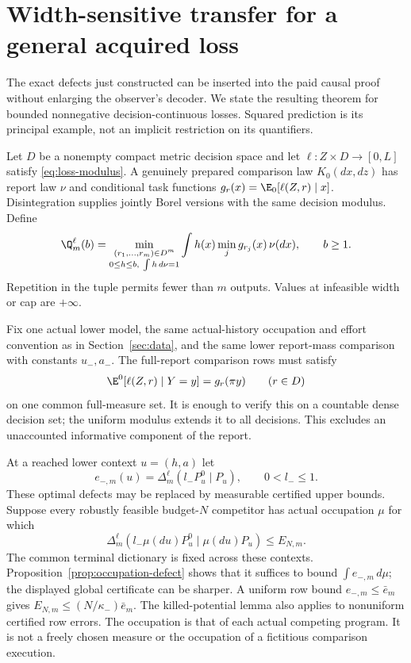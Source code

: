 \section{Width-sensitive transfer for a general acquired loss}\label{sec:loss-transfer}
The exact defects just constructed can be inserted into the paid causal proof without enlarging the observer's decoder. We state the resulting theorem for bounded nonnegative decision-continuous losses. Squared prediction is its principal example, not an implicit restriction on its quantifiers.

Let $D$ be a nonempty compact metric decision space and let $\ell:Z\times D\to[0,L]$ satisfy \eqref{eq:loss-modulus}. A genuinely prepared comparison law $K_0(dx,dz)$ has report law $\nu$ and conditional task functions $g_r(x)=\E_0[\ell(Z,r)\mid x]$. Disintegration supplies jointly Borel versions with the same decision modulus. Define
\begin{equation}\label{eq:general-profile}
 \Q_m^\ell(b)=\min_{\substack{(r_1,\ldots,r_m)\in D^m\\0\le h\le b,\ \int h\,d\nu=1}}
       \int h(x)\min_j g_{r_j}(x)\,\nu(dx),\qquad b\ge1.
\end{equation}
Repetition in the tuple permits fewer than $m$ outputs. Values at infeasible width or cap are $+\infty$.

Fix one actual lower model, the same actual-history occupation and effort convention as in Section~\ref{sec:data}, and the same lower report-mass comparison with constants $u_-,a_-$. The full-report comparison rows must satisfy
\begin{equation}\label{eq:full-loss-factor}
 \E^0[\ell(Z,r)\mid Y=y]=g_r(\pi y)\qquad(r\in D)
\end{equation}
on one common full-measure set. It is enough to verify this on a countable dense decision set; the uniform modulus extends it to all decisions. This excludes an unaccounted informative component of the report.

At a reached lower context $u=(h,a)$ let
\begin{equation}\label{eq:row-width-error}
 e_{-,m}(u)=\Delta_m^\ell(l_-P^0_u\mid P_u),\qquad 0<l_-\le1.
\end{equation}
These optimal defects may be replaced by measurable certified upper bounds. Suppose every robustly feasible budget-$N$ competitor has actual occupation $\mu$ for which
\begin{equation}\label{eq:global-width-error}
 \Delta_m^\ell(l_-\mu(du)P^0_u\mid\mu(du)P_u)\le E_{N,m}.
\end{equation}
The common terminal dictionary is fixed across these contexts. Proposition~\ref{prop:occupation-defect} shows that it suffices to bound $\int e_{-,m}\,d\mu$; the displayed global certificate can be sharper. A uniform row bound $e_{-,m}\le\bar e_m$ gives $E_{N,m}\le(N/\kappa_-)\bar e_m$. The killed-potential lemma also applies to nonuniform certified row errors. The occupation is that of each actual competing program. It is not a freely chosen measure or the occupation of a fictitious comparison execution.

